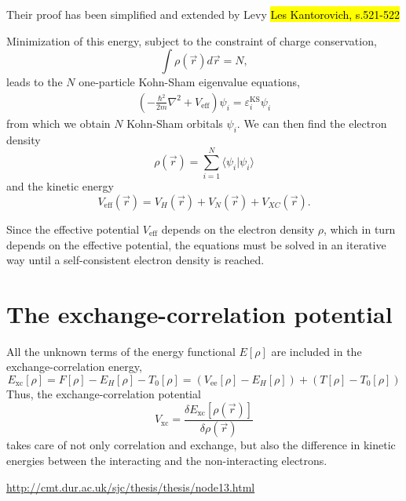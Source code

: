 \documentclass[11pt,bibliography=totoc,index=totoc]{scrbook}   %
\newcommand{\comment}[1]{\hl{#1}}
\begin{document}
Their proof has been simplified and extended by Levy 
\comment{Les Kantorovich, s.521-522}

Minimization of this energy, subject to the constraint
of charge conservation,
\begin{equation}
  \int \rho(\vec{r})d\vec{r} = N,
\end{equation}
leads to the $N$ one-particle Kohn-Sham eigenvalue equations,
\begin{align}
  \left(-\frac{\hbar^2}{2m}\nabla^2 + V_{\text{eff}}\right) \psi_i =
  \varepsilon_i^\text{KS} \psi_i
\end{align}
from which we obtain $N$ Kohn-Sham orbitals $\psi_i$. We can then 
find the electron density
\begin{equation}
  \rho(\vec{r}) = \sum_{i=1}^N \langle \psi_i|\psi_i\rangle
\end{equation}
and the kinetic energy
\begin{equation}
  V_{\text{eff}}(\vec{r}) = V_H(\vec{r}) + V_N(\vec{r}) + V_{XC}(\vec{r}).
  \label{eq:eff-pot}
\end{equation}

Since the effective potential $V_{\text{eff}}$ depends on the electron 
density $\rho$, which in turn depends on the effective potential, the equations
must be solved in an iterative way until a self-consistent electron density is 
reached.

\section{The exchange-correlation potential}

All the unknown terms of the energy functional $E[\rho]$ are included in the exchange-correlation energy, 
\begin{equation}
  E_{\mathrm{xc}}[\rho] = F[\rho] - E_H[\rho] - T_0[\rho] = (V_{\text{ee}}[\rho] - E_H[\rho]) + (T[\rho] - T_0[\rho])
\end{equation}
Thus, the exchange-correlation potential
\begin{equation}
  V_{\mathrm{xc}} = \frac{\delta E_{\mathrm{xc}}[\rho(\vec{r})]}{\delta\rho(\vec{r})}
\end{equation}
takes care of not only correlation and exchange, but also the difference in kinetic energies between the interacting and the non-interacting electrons.

\url{http://cmt.dur.ac.uk/sjc/thesis/thesis/node13.html}
\end{document}
